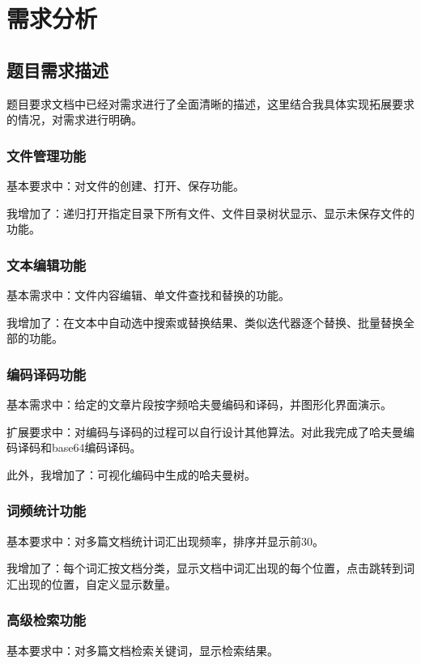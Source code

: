 \documentclass[scheme = chinese]{ctexart}
\begin{document}
\tableofcontents
\clearpage

\section{需求分析}
\subsection{题目需求描述}
题目要求文档中已经对需求进行了全面清晰的描述，这里结合我具体实现拓展要求的情况，对需求进行明确。

\subsubsection{文件管理功能}
基本要求中：对文件的创建、打开、保存功能。

我增加了：递归打开指定目录下所有文件、文件目录树状显示、显示未保存文件的功能。

\subsubsection{文本编辑功能}
基本需求中：文件内容编辑、单文件查找和替换的功能。

我增加了：在文本中自动选中搜索或替换结果、类似迭代器逐个替换、批量替换全部的功能。

\subsubsection{编码译码功能}
基本需求中：给定的文章片段按字频哈夫曼编码和译码，并图形化界面演示。

扩展要求中：对编码与译码的过程可以自行设计其他算法。对此我完成了哈夫曼编码译码和base64编码译码。

此外，我增加了：可视化编码中生成的哈夫曼树。

\subsubsection{词频统计功能}
基本要求中：对多篇文档统计词汇出现频率，排序并显示前30。

我增加了：每个词汇按文档分类，显示文档中词汇出现的每个位置，点击跳转到词汇出现的位置，自定义显示数量。

\subsubsection{高级检索功能}
基本要求中：对多篇文档检索关键词，显示检索结果。
\end{document}

